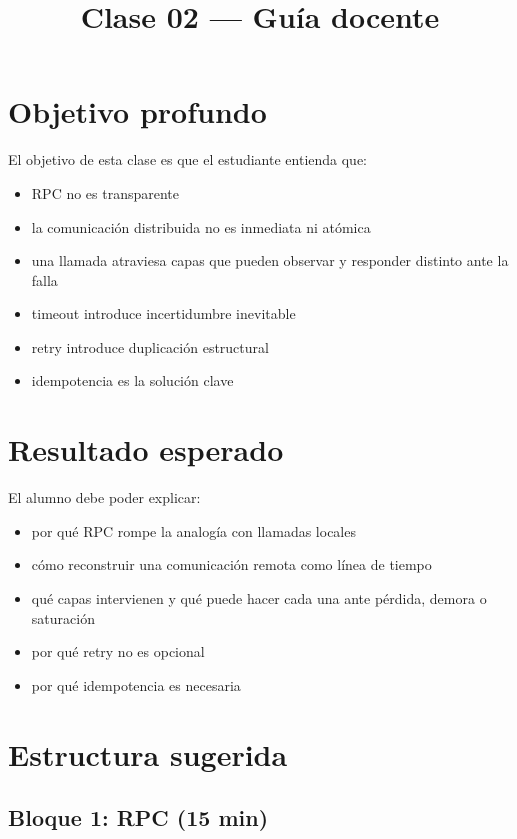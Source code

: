 \documentclass[variant=docente,cover=institutional,mode=screen]{ua-engineering-v6-article}
\title{Clase 02 --- Guía docente}
\author{\UAProfessor}
\date{\UADate}
\begin{document}
\maketitle

\section{Objetivo profundo}

El objetivo de esta clase es que el estudiante entienda que:

\begin{itemize}
\item RPC no es transparente
\item la comunicación distribuida no es inmediata ni atómica
\item una llamada atraviesa capas que pueden observar y responder distinto ante la falla
\item timeout introduce incertidumbre inevitable
\item retry introduce duplicación estructural
\item idempotencia es la solución clave
\end{itemize}

\section{Resultado esperado}

El alumno debe poder explicar:

\begin{itemize}
\item por qué RPC rompe la analogía con llamadas locales
\item cómo reconstruir una comunicación remota como línea de tiempo
\item qué capas intervienen y qué puede hacer cada una ante pérdida, demora o saturación
\item por qué retry no es opcional
\item por qué idempotencia es necesaria
\end{itemize}

\section{Estructura sugerida}

\subsection*{Bloque 1: RPC (15 min)}
\end{document}
